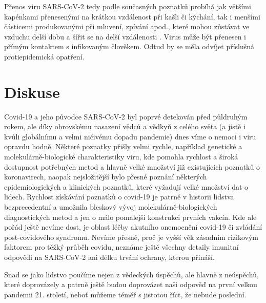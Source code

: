 Přenos viru SARS-CoV-2 tedy podle současných poznatků probíhá jak většími kapénkami přenesenými na krátkou vzdálenost při kašli či kýchání, tak i menšími částicemi produkovanými při mluvení, zpívání apod., které mohou zůstávat ve vzduchu delší dobu a šířit se na delší vzdálenosti \cite{Leung:2021}. Virus může být přenesen i přímým kontaktem s infikovaným člověkem. Odtud by se měla odvíjet příslušná protiepidemická opatření.

\section*{Diskuse}
Covid-19 a jeho původce SARS-CoV-2 byl poprvé detekován před půldruhým rokem, ale díky obrovskému nasazení vědců a vědkyň z celého světa (a jistě i kvůli globálnímu a velmi ničivému dopadu pandemie) dnes víme o nemoci i viru opravdu hodně. Některé poznatky přišly velmi rychle, například genetické a molekulárně-biologické charakteristiky viru, kde pomohla rychlost a široká dostupnost potřebných metod a hlavně velké množství již existujících poznatků o koronavirech, naopak nejsložitější bylo přesné poznání některých epidemiologických a klinických poznatků, které vyžadují velké množství dat o lidech. Rychlost získávání poznatků o covid-19 je patrně v historii lidstva bezprecedentní a umožnila bleskový vývoj molekulárně-biologických diagnostických metod a jen o málo pomalejší konstrukci prvních vakcín. Kde ale pořád ještě nevíme dost, je oblast léčby akutního onemocnění covid-19 či zvládání post-covidového syndromu. Nevíme přesně, proč je vyšší věk zásadním rizikovým faktorem pro těžký průběh covidu, neznáme ještě všechny detaily imunitní odpovědi na SARS-CoV-2 ani délku trvání ochrany, kterou přináší.

Snad se jako lidstvo poučíme nejen z vědeckých úspěchů, ale hlavně z neúspěchů, které doprovázely a patrně ještě budou doprovázet naši odpověď na první velkou pandemii 21. století, neboť můžeme téměř s jistotou říct, že nebude poslední.









